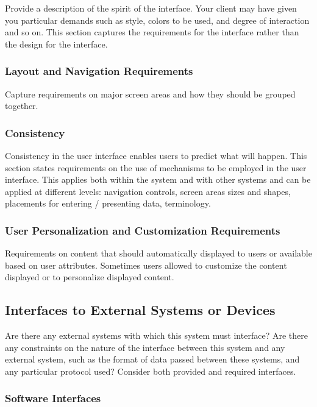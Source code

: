 Provide a description of the spirit of the interface. Your client may have given you particular demands such as style, colors to be used, and degree of interaction and so on. This section captures the requirements for the interface rather than the design for the interface.

\subsubsection{Layout and Navigation Requirements}

Capture requirements on major screen areas and how they should be grouped together.

\subsubsection{Consistency}

Consistency in the user interface enables users to predict what will happen. This section states requirements on the use of mechanisms to be employed in the user interface. This applies both within the system and with other systems and can be applied at different levels: navigation controls, screen areas sizes and shapes, placements for entering / presenting data, terminology.

\subsubsection{User Personalization and Customization Requirements}

Requirements on content that should automatically displayed to users or available based on user attributes. Sometimes users allowed to customize the content displayed or to personalize displayed content.

\subsection{Interfaces to External Systems or Devices}

Are there any external systems with which this system must interface? Are there any constraints on the nature of the interface between this system and any external system, such as the format of data passed between these systems, and any particular protocol used? Consider both provided and required interfaces.

\subsubsection{Software Interfaces}

